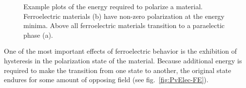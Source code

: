 \begin{figure}[tb]
   \centering
   \caption[Energy vs. Polarization Plots for FE and PE Materials]%
   		{Example plots of the energy required to polarize a material. Ferroelectric materials (b) have %
		non-zero polarization at the energy minima. Above \Tc{} all ferroelectric materials transition %
		to a paraelectic phase (a).}
   \label{fig:EvP}
\end{figure}

One of the most important effects of ferroelectric behavior is the exhibition of hysteresis in the polarization state of the material.  Because additional energy is required to make the transition from one state to another, the original state endures for some amount of opposing field (see fig.~\vref{fig:PvElec-FE}).

